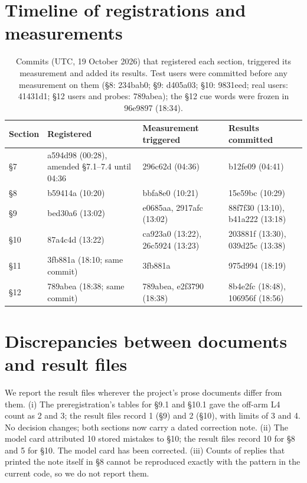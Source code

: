 \documentclass[10pt,twocolumn]{article}
\begin{document}
\section{Timeline of registrations and measurements}\label{app:timeline}

\begin{table}[H]
\centering
\small
\caption{Commits (UTC, 19 October 2026) that registered each section, triggered its measurement and added its results.
Test users were committed before any measurement on them (\S8: 234bab0; \S9: d405a03; \S10: 9831eed; real users:
41431d1; \S12 users and probes: 789abea); the \S12 cue words were frozen in 96e9897 (18:34).}
\label{tab:timeline}
\begin{tabular}{@{}llll@{}}
\toprule
Section & Registered & Measurement triggered & Results committed \\
\midrule
\S7 & a594d98 (00:28), amended \S7.1--7.4 until 04:36 & 296c62d (04:36) & b12fe09 (04:41) \\
\S8 & b59414a (10:20) & bbfa8e0 (10:21) & 15e59bc (10:29) \\
\S9 & bed30a6 (13:02) & e0685aa, 2917afc (13:02) & 88f7f30 (13:10), b41a222 (13:18) \\
\S10 & 87a4c4d (13:22) & ca923a0 (13:22), 26c5924 (13:23) & 203881f (13:30), 039d25c (13:38) \\
\S11 & 3fb881a (18:10; same commit) & 3fb881a & 975d994 (18:19) \\
\S12 & 789abea (18:38; same commit) & 789abea, e2f3790 (18:38) & 8b4e2fc (18:48), 106956f (18:56) \\
\bottomrule
\end{tabular}
\end{table}

\section{Discrepancies between documents and result files}\label{app:discrepancies}

We report the result files wherever the project's prose documents differ from them. (i) The preregistration's tables for
\S9.1 and \S10.1 gave the off-arm L4 count as 2 and 3; the result files record 1 (\S9) and 2 (\S10), with limits of 3 and
4. No decision changes; both sections now carry a dated correction note. (ii) The model card attributed 10 stored
mistakes to \S10; the result files record 10 for \S8 and 5 for \S10. The model card has been corrected. (iii) Counts of replies that printed the note itself in \S8 cannot be reproduced exactly with the pattern in
the current code, so we do not report them.
\end{document}
